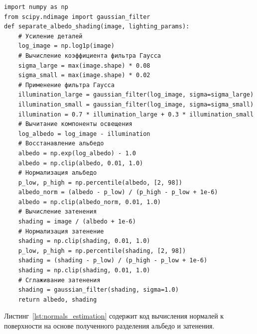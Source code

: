 \begin{center}
    \begin{lstlisting}[label=lst:albedo_separation,caption=Разделение альбедо и затенения]
import numpy as np
from scipy.ndimage import gaussian_filter
def separate_albedo_shading(image, lighting_params):
    # Усиление деталей
    log_image = np.log1p(image)
    # Вычисление коэффициента фильтра Гаусса
    sigma_large = max(image.shape) * 0.08
    sigma_small = max(image.shape) * 0.02
    # Применение фильтра Гаусса
    illumination_large = gaussian_filter(log_image, sigma=sigma_large)
    illumination_small = gaussian_filter(log_image, sigma=sigma_small)
    illumination = 0.7 * illumination_large + 0.3 * illumination_small
    # Вычитание компоненты освещения
    log_albedo = log_image - illumination
    # Восстанавление альбедо
    albedo = np.exp(log_albedo) - 1.0
    albedo = np.clip(albedo, 0.01, 1.0)
    # Нормализация альбедо
    p_low, p_high = np.percentile(albedo, [2, 98])
    albedo_norm = (albedo - p_low) / (p_high - p_low + 1e-6)
    albedo = np.clip(albedo_norm, 0.01, 1.0)
    # Вычисление затенения
    shading = image / (albedo + 1e-6)
    # Нормализация затенение
    shading = np.clip(shading, 0.01, 1.0)
    p_low, p_high = np.percentile(shading, [2, 98])
    shading = (shading - p_low) / (p_high - p_low + 1e-6)
    shading = np.clip(shading, 0.01, 1.0)
    # Сглаживание затенения
    shading = gaussian_filter(shading, sigma=1.0)
    return albedo, shading
    \end{lstlisting}
\end{center}

Листинг~\ref{lst:normals_estimation} содержит код вычисления нормалей к поверхности на основе полученного разделения альбедо и затенения.

